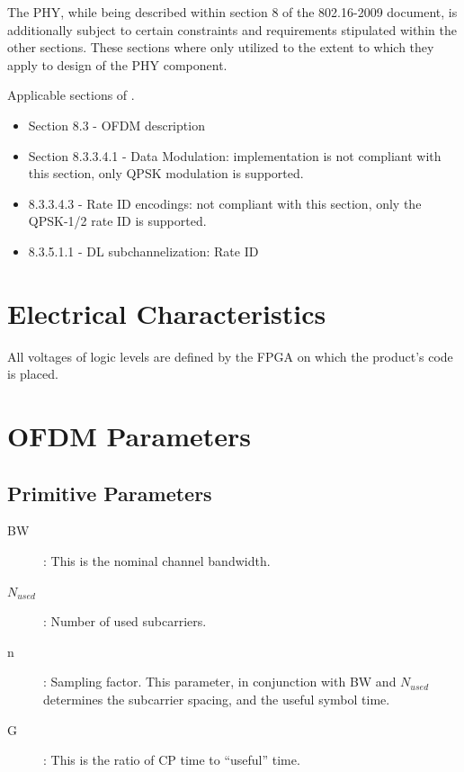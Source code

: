 \documentclass[dvips,10pt,twocolumn]{article}
\begin{document}
	The PHY, while being described within section 8 of the 802.16-2009
	document, is additionally subject to certain constraints and
	requirements stipulated within the other sections.  These sections
	where only utilized to the extent to which they apply to design of
	the PHY component.

	Applicable sections of \cite{IEEE:802.16}.
	\begin{itemize}
		\item Section 8.3 - OFDM description
		\item Section 8.3.3.4.1 - Data Modulation: implementation
			is not compliant with this section, only QPSK
			modulation is supported.
		\item 8.3.3.4.3 - Rate ID encodings: not compliant with
			this section, only the QPSK-1/2 rate ID is supported.
		\item 8.3.5.1.1 - DL subchannelization: Rate ID
	\end{itemize}

\section{Electrical Characteristics}
All voltages of logic levels are defined by the FPGA on which the product's
code is placed.


\section{OFDM Parameters}

\subsection{Primitive Parameters}

\begin{description}
	\item[BW]: This is the nominal channel bandwidth.
	\item[$N_{used}$]: Number of used subcarriers.
	\item[n]: Sampling factor. This parameter, in conjunction with BW
		and $N_{used}$ determines the subcarrier spacing, and the
		useful symbol time.
	\item[G]: This is the ratio of CP time to ``useful'' time.
\end{description}


\end{document}
